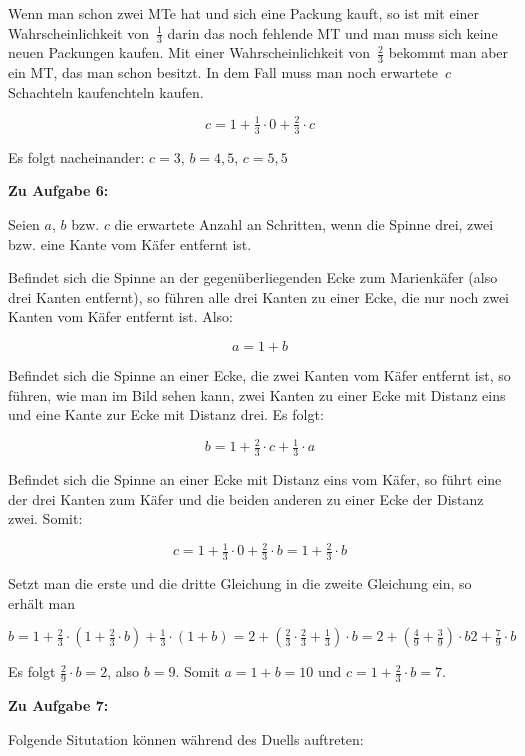 \documentclass{article}
\begin{document}
Wenn man schon zwei MTe hat und sich eine Packung kauft, so ist mit einer Wahrscheinlichkeit von~$\tfrac{1}{3}$ darin das noch fehlende MT und man muss sich keine neuen Packungen kaufen.
Mit einer Wahrscheinlichkeit von~$\tfrac{2}{3}$ bekommt man aber ein MT, das man schon besitzt. In dem Fall muss man noch erwartete~$c$ Schachteln kaufenchteln kaufen.

\[ c = 1 + \tfrac{1}{3} \cdot 0 + \tfrac{2}{3} \cdot c \]

Es folgt nacheinander: $c = 3$, $b = 4,5$, $c = 5,5$


\textbf{Zu Aufgabe 6:}

Seien $a$, $b$ bzw. $c$ die erwartete Anzahl an Schritten, wenn die Spinne drei, zwei bzw. eine Kante vom Käfer entfernt ist.

Befindet sich die Spinne an der gegenüberliegenden Ecke zum Marienkäfer (also drei Kanten entfernt), so führen alle drei Kanten zu einer Ecke, die nur noch zwei Kanten vom Käfer entfernt ist. Also:

\[ a = 1 + b \]

Befindet sich die Spinne an einer Ecke, die zwei Kanten vom Käfer entfernt ist, so führen, wie man im Bild sehen kann, zwei Kanten zu einer Ecke mit Distanz eins und eine Kante zur Ecke mit Distanz drei. Es folgt:

\[ b = 1 + \tfrac{2}{3} \cdot c + \tfrac{1}{3} \cdot a \]

Befindet sich die Spinne an einer Ecke mit Distanz eins vom Käfer, so führt eine der drei Kanten zum Käfer und die beiden anderen zu einer Ecke der Distanz zwei. Somit:

\[ c = 1 + \tfrac{1}{3} \cdot 0 + \tfrac{2}{3} \cdot b = 1 + \tfrac{2}{3} \cdot b \]

Setzt man die erste und die dritte Gleichung in die zweite Gleichung ein, so erhält man

\[
  b =
  1 + \tfrac{2}{3} \cdot (1 + \tfrac{2}{3} \cdot b) + \tfrac{1}{3} \cdot (1 + b) =
  2 + (\tfrac{2}{3} \cdot \tfrac{2}{3} + \tfrac{1}{3}) \cdot b =
  2 + (\tfrac{4}{9} + \tfrac{3}{9}) \cdot b
  2 + \tfrac{7}{9} \cdot b
\]

Es folgt $\tfrac{2}{9} \cdot b = 2$, also $b = 9$. Somit $a = 1 + b = 10$ und $c = 1 + \tfrac{2}{3} \cdot b = 7$.


\textbf{Zu Aufgabe 7:}

Folgende Situtation können während des Duells auftreten:
\end{document}
